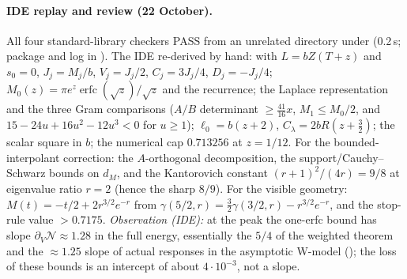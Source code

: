\paragraph{IDE replay and review (22 October).} All four standard-library checkers PASS from an unrelated directory under  (0.2\,s; package and
log in ). The IDE re-derived by hand: with $L=bZ(T+z)$ and $s_0=0$, $J_j=M_j/b$, $V_j=J_j/2$, $C_j=3J_j/4$, $D_j=-J_j/4$;
$M_0(z)=\pi e^z\operatorname{erfc}(\sqrt z)/\sqrt z$ and the recurrence; the Laplace representation and the three Gram comparisons ($A/B$ determinant $\ge\frac{41}{16}x$,
$M_1\le M_0/2$, and $15-24u+16u^2-12u^3<0$ for $u\ge1$); $\ell_0=b(z+2)$, $C_\lambda=2bR(z+\frac32)$; the scalar square in $b$; the numerical cap $0.713256$ at $z=1/12$.
For the bounded-interpolant correction: the $A$-orthogonal decomposition, the support/Cauchy--Schwarz bounds on $d_M$, and the Kantorovich constant $(r+1)^2/(4r)=9/8$ at eigenvalue ratio
$r=2$ (hence the sharp $8/9$). For the visible geometry: $M(t)=-t/2+2r^{3/2}e^{-r}$ from $\gamma(5/2,r)=\frac32\gamma(3/2,r)-r^{3/2}e^{-r}$, and the stop-rule value $>0.7175$.
\emph{Observation (IDE):} at the peak the one-erfc bound has slope $\partial_V\mathcal N\approx1.28$ in the full energy, essentially the $5/4$ of the weighted theorem and the
$\approx1.25$ slope of actual responses in the asymptotic W-model (); the loss of these bounds is an intercept of about $4\cdot10^{-3}$, not a slope.
